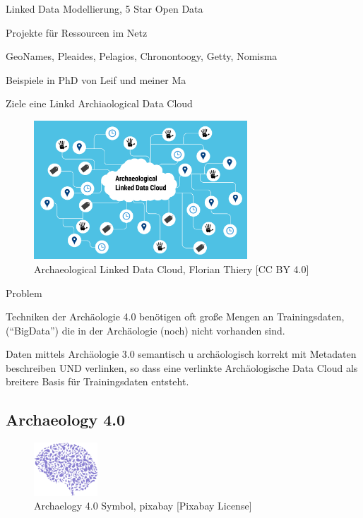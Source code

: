 \documentclass[twocolumn]{autart}
\begin{document}
Linked Data Modellierung, 5 Star Open Data

Projekte für Ressourcen im Netz

GeoNames, Pleaides, Pelagios, Chronontoogy, Getty, Nomisma

Beispiele in PhD von Leif und meiner Ma

\cite{bernerslee_linkeddata}

\cite{hausenblas_5star}

\cite{isaksen_archaeology}

\cite{thiery_geinarfa}

Ziele eine Linkd Archiaological Data Cloud

\begin{figure}[!htb]
\begin{center}
\includegraphics[width=8cm]{Archaeological_Linked_Data_Cloud_(ALDC).png}    %
\caption{Archaeological Linked Data Cloud, Florian Thiery [CC BY 4.0]}  %
\label{figaaldc}                                 %
\end{center}                                 %
\end{figure}

Problem 

Techniken der Archäologie
4.0 benötigen oft große
Mengen an Trainingsdaten,
(“BigData”) die in der
Archäologie (noch) nicht
vorhanden sind.

Daten mittels Archäologie 3.0
semantisch u archäologisch
korrekt mit Metadaten
beschreiben UND verlinken,
so dass eine verlinkte
Archäologische Data Cloud
als breitere Basis für
Trainingsdaten entsteht.

\subsection{Archaeology 4.0}

\begin{figure}[!htb]
\begin{center}
\includegraphics[height=2cm]{a40.png}    %
\caption{Archaelogy 4.0 Symbol, pixabay [Pixabay License]}  %
\label{figa40symbol}                                 %
\end{center}                                 %
\end{figure}
\end{document}
